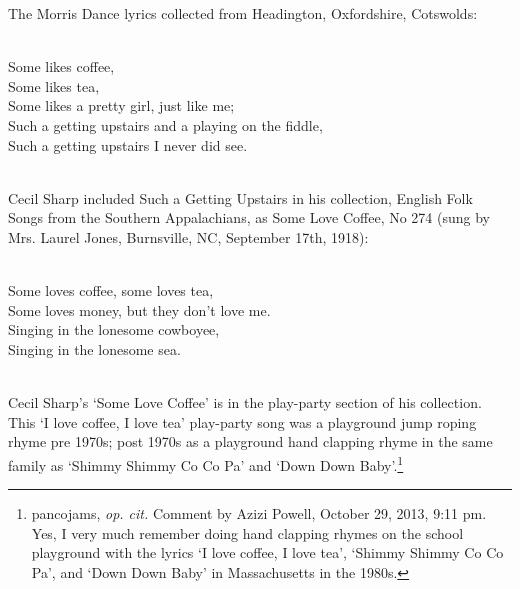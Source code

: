\documentclass[10pt]{article}
\begin{document}
{\begin{minipage}{7.0in}
The Morris Dance lyrics collected from Headington, Oxfordshire, Cotswolds:

{\parindent0pt
  \raggedright
  ~\\
  Some likes coffee, \\
  Some likes tea, \\
  Some likes a pretty girl, just like me; \\
  Such a getting upstairs and a playing on the fiddle, \\
  Such a getting upstairs I never did see. \\
  ~\\
}

Cecil Sharp included Such a Getting Upstairs in his collection,
English Folk Songs from the Southern Appalachians, as Some Love
Coffee, No 274 (sung by Mrs. Laurel Jones, Burnsville, NC, September
17th, 1918):

{\parindent0pt
  \raggedright
  ~\\
  Some loves coffee, some loves tea, \\
  Some loves money, but they don't love me. \\
  Singing in the lonesome cowboyee, \\
  Singing in the lonesome sea. \\
  ~\\
}

Cecil Sharp's `Some Love Coffee' is in the play-party section of his
collection. This `I love coffee, I love tea' play-party song was a
playground jump roping rhyme pre 1970s; post 1970s as a playground
hand clapping rhyme in the same family as `Shimmy Shimmy Co Co Pa' and
`Down Down Baby'.\footnote{pancojams, \textit{op. cit.} Comment by Azizi Powell, October 29, 2013, 9:11 pm. Yes, I very much remember doing hand clapping rhymes on the school playground with the lyrics `I love coffee, I love tea', `Shimmy Shimmy Co Co Pa', and `Down Down Baby' in Massachusetts in the 1980s.}

  \end{minipage}
  \vspace*{\fill}
}
\end{document}
